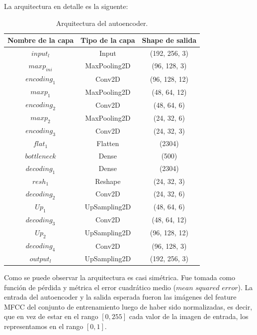 \documentclass[colorinlistoftodos,twoside,twocolumn,10pt]{article} %
\begin{document}
La arquitectura en detalle es la siguente:
\begin{table}[h!]
	\begin{center}
		\begin{tabular}{ | c | c | c |}
			\hline
			\textbf{Nombre de la capa} & \textbf{Tipo de la capa} & \textbf{Shape de salida} \\ \hline
			$input_l$ & Input & (192, 256, 3) \\ \hline
			$maxp_{ini}$ & MaxPooling2D & (96, 128, 3) \\ \hline
			$encoding_1$ & Conv2D & (96, 128, 12) \\ \hline
			$maxp_1$ & MaxPooling2D & (48, 64, 12) \\ \hline
			$encoding_2$ & Conv2D & (48, 64, 6) \\ \hline
			$maxp_2$ & MaxPooling2D & (24, 32, 6) \\ \hline
			$encoding_3$ & Conv2D & (24, 32, 3) \\ \hline
			$flat_1$ & Flatten & (2304) \\ \hline
			$bottleneck$ & Dense & (500) \\ \hline
			$decoding_1$ & Dense & (2304) \\ \hline
			$resh_1$ & Reshape & (24, 32, 3) \\ \hline
			$decoding_2$ & Conv2D & (24, 32, 6) \\ \hline
			$Up_1$ & UpSampling2D & (48, 64, 6) \\ \hline
			$decoding_3$ & Conv2D & (48, 64, 12) \\ \hline
			$Up_2$ & UpSampling2D & (96, 128, 12) \\ \hline
			$decoding_4$ & Conv2D & (96, 128, 3) \\ \hline
			$output_l$ & UpSampling2D & (192, 256, 3) \\
			\hline
		\end{tabular}
		\caption{Arquitectura del autoencoder.}
		\label{tabla:1}
	\end{center}
\end{table}

Como se puede observar la arquitectura es casi sim\'etrica.
Fue tomada como funci\'on de p\'erdida y m\'etrica el error cuadr\'atico medio ($\textit{mean squared error}$). La entrada del autoencoder y la salida esperada fueron las im\'agenes del feature MFCC del conjunto de entrenamiento luego de haber sido normalizadas, es decir, que en vez de estar en el rango $[0, 255]$ cada valor de la imagen de entrada, los representamos en el rango $[0, 1]$. 
\end{document}
